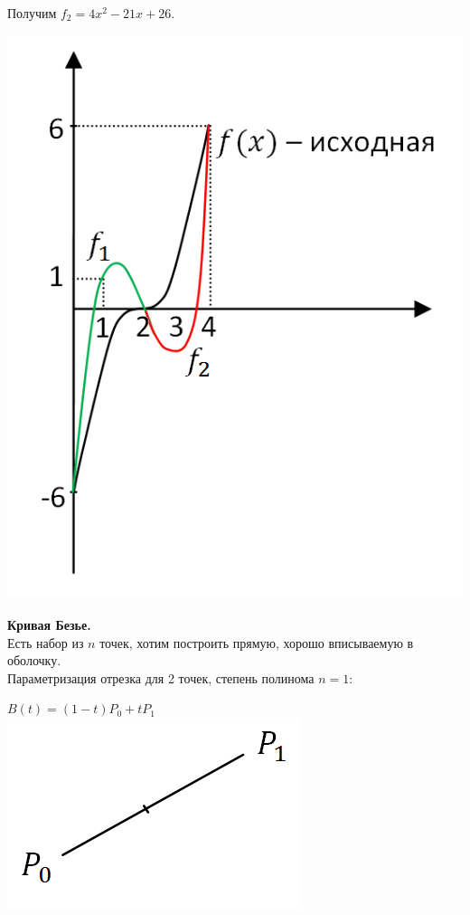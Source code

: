 \documentclass[12pt]{article}
\theoremstyle{definition}
\numberwithin{equation}{section}
\begin{document}
	Получим $f_2 = 4x^2-21x+26$.\begin{center}
		\includegraphics[scale=0.7]{l3_6.png}\end{center}
	\noindent \textbf{Кривая Безье.}\\
	Есть набор из $n$ точек, хотим построить прямую, хорошо вписываемую в оболочку.\\
	Параметризация отрезка для 2 точек, степень полинома $n = 1$:
	\begin{center}
		$B(t) = (1-t)P_0+tP_1$\\
		\includegraphics[scale=0.5]{l3_7.png}\end{center}
\end{document}
